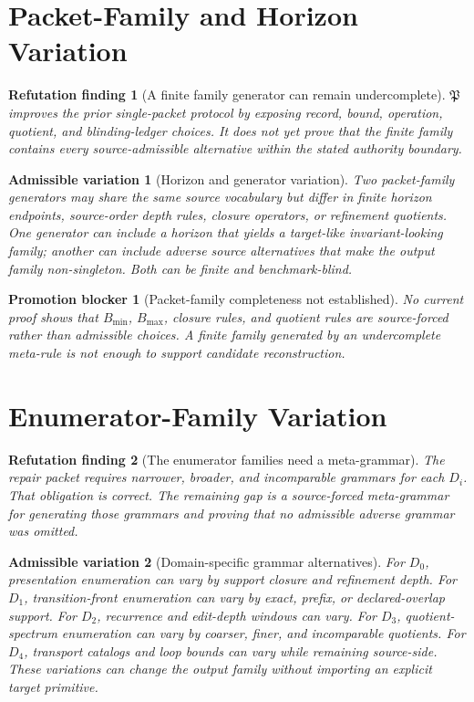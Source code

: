 \documentclass[11pt]{article}
\newcommand{\PackFam}{\mathfrak{P}}
\newtheorem{finding}{Refutation finding}
\newtheorem{variation}{Admissible variation}
\newtheorem{blocker}{Promotion blocker}
\begin{document}
\section{Packet-Family and Horizon Variation}

\begin{finding}[A finite family generator can remain undercomplete]
\(\PackFam\) improves the prior single-packet protocol by exposing record,
bound, operation, quotient, and blinding-ledger choices. It does not yet
prove that the finite family contains every source-admissible alternative
within the stated authority boundary.
\end{finding}

\begin{variation}[Horizon and generator variation]
Two packet-family generators may share the same source vocabulary but differ
in finite horizon endpoints, source-order depth rules, closure operators,
or refinement quotients. One generator can include a horizon that yields a
target-like invariant-looking family; another can include adverse source
alternatives that make the output family non-singleton. Both can be finite
and benchmark-blind.
\end{variation}

\begin{blocker}[Packet-family completeness not established]
No current proof shows that \(B_{\min}\), \(B_{\max}\), closure rules, and
quotient rules are source-forced rather than admissible choices. A finite
family generated by an undercomplete meta-rule is not enough to support
candidate reconstruction.
\end{blocker}

\section{Enumerator-Family Variation}

\begin{finding}[The enumerator families need a meta-grammar]
The repair packet requires narrower, broader, and incomparable grammars for
each \(D_i\). That obligation is correct. The remaining gap is a
source-forced meta-grammar for generating those grammars and proving that no
admissible adverse grammar was omitted.
\end{finding}

\begin{variation}[Domain-specific grammar alternatives]
For \(D_0\), presentation enumeration can vary by support closure and
refinement depth. For \(D_1\), transition-front enumeration can vary by exact,
prefix, or declared-overlap support. For \(D_2\), recurrence and edit-depth
windows can vary. For \(D_3\), quotient-spectrum enumeration can vary by
coarser, finer, and incomparable quotients. For \(D_4\), transport catalogs
and loop bounds can vary while remaining source-side. These variations can
change the output family without importing an explicit target primitive.
\end{variation}
\end{document}
